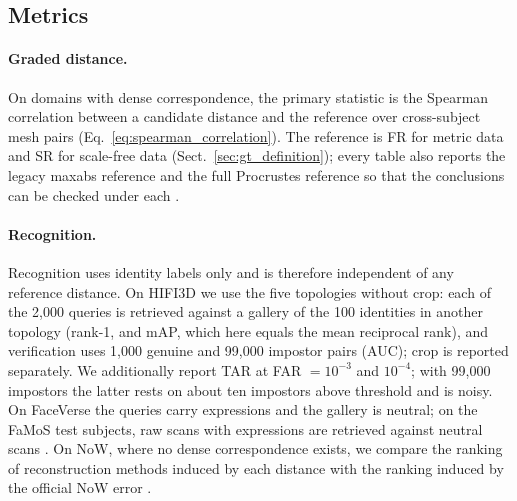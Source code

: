 \subsection{Metrics}
\label{sec:protocol_metrics}

\paragraph{Graded distance.}
On domains with dense correspondence, the primary statistic is the Spearman
correlation between a candidate distance and the reference over cross-subject
mesh pairs (Eq.~\eqref{eq:spearman_correlation}). The reference is FR for
metric data and SR for scale-free data (Sect.~\ref{sec:gt_definition}); every
table also reports the legacy maxabs reference and the full Procrustes
reference so that the conclusions can be checked under each
.

\paragraph{Recognition.}
Recognition uses identity labels only and is therefore independent of any
reference distance. On HIFI3D we use the five topologies without crop: each
of the 2{,}000 queries is retrieved against a gallery of the 100 identities
in another topology (rank-1, and mAP, which here equals the mean reciprocal
rank), and verification uses 1{,}000 genuine and 99{,}000 impostor pairs
(AUC); crop is reported separately.
We additionally report TAR at FAR $=10^{-3}$ and $10^{-4}$; with 99{,}000
impostors the latter rests on about ten impostors above threshold and is
noisy.
On FaceVerse the queries carry expressions and the gallery is neutral; on the
FaMoS test subjects, raw scans with expressions are retrieved against neutral
scans .
On NoW, where no dense correspondence exists, we compare the ranking of
reconstruction methods induced by each distance with the ranking induced by
the official NoW error .

